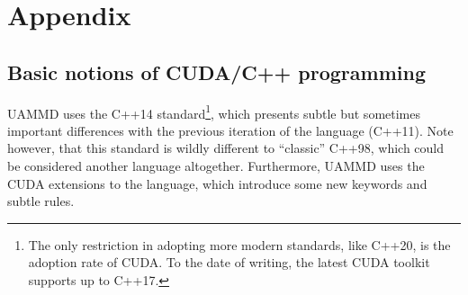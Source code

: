 \documentclass[ twoside,openright,titlepage,numbers=noenddot,%
headinclude,footinclude,cleardoublepage=empty,abstract=on,
BCOR=5mm,paper=a4,fontsize=11pt, dvipsnames
]{scrreprt}
\newcommand{\uammd}{\gls{UAMMD}\xspace}
\begin{document}
%
%
%


\part{Appendix}

\appendix

\chapter{Basic notions of CUDA/C++ programming}\label{sec:cpp}

\uammd uses the C++14 standard\footnote{The only restriction in adopting more modern standards, like C++20, is the adoption rate of CUDA. To the date of writing, the latest CUDA toolkit supports up to C++17.}, which presents subtle but sometimes important differences with the previous iteration of the language (C++11). Note however, that this standard is wildly different to ``classic'' C++98, which could be considered another language altogether. Furthermore, \uammd uses the CUDA extensions to the language, which introduce some new keywords and subtle rules.
\end{document}
